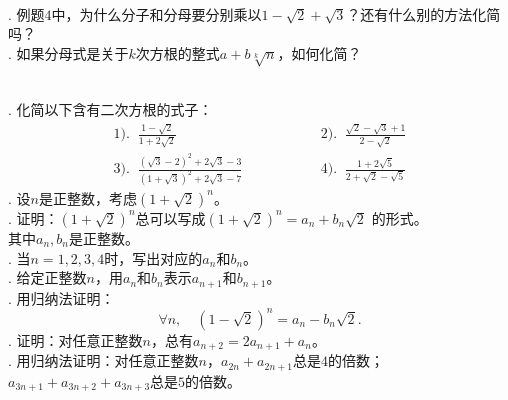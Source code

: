 \documentclass[12pt,UTF8,fontset=none]{ctexbook}
\begin{document}
\begin{sk}
    \mbox{} \\
    . 例题$4$中，为什么分子和分母要分别乘以$1 - \sqrt{2} + \sqrt{3}$？还有什么别的方法化简吗？\\
    . 如果分母式是关于$k$次方根的整式$a + b\sqrt[k]{n}$，如何化简？
\end{sk}

\begin{xt}
    \mbox{} \\
    . 化简以下含有二次方根的式子：\\
    $$
    \begin{array}{lll}
       1).\;\; \displaystyle \frac{1 - \sqrt{2}}{1 + 2\sqrt{2}} &  \phantom{00000000} & 2).\;\; \displaystyle \frac{\sqrt{2} - \sqrt{3} + 1}{2 - \sqrt{2}} \\[2em]
       3).\;\; \displaystyle \frac{(\sqrt{3} - 2)^2 + 2\sqrt{3} - 3}{(1 + \sqrt{3})^2 + 2\sqrt{3} - 7} &  \phantom{00000000} & 4).\;\; \displaystyle \frac{1 + 2\sqrt{5}}{2 + \sqrt{2} - \sqrt{5}}
    \end{array}
    $$
    . 设$n$是正整数，考虑$(1 + \sqrt{2})^n$。\\
    . 证明：$(1 + \sqrt{2})^n$总可以写成$(1 + \sqrt{2})^n = a_n + b_n \sqrt{2}$
    的形式。\\
    \indent \phantom{2.1.} 其中$a_n, b_n$是正整数。\\
    . 当$n=1,2,3,4$时，写出对应的$a_n$和$b_n$。\\
    . 给定正整数$n$，用$a_n$和$b_n$表示$a_{n+1}$和$b_{n+1}$。\\
    . 用归纳法证明：
    $$\forall n, \quad (1 - \sqrt{2})^n = a_n - b_n \sqrt{2}.$$ 
    . 证明：对任意正整数$n$，总有$a_{n+2} = 2a_{n+1} + a_n$。\\
    . 用归纳法证明：对任意正整数$n$，$a_{2n} + a_{2n+1}$总是$4$的倍数；\\
    \indent \phantom{2.1.} $a_{3n+1} + a_{3n+2} + a_{3n+3}$总是$5$的倍数。

\end{xt}
\end{document}
